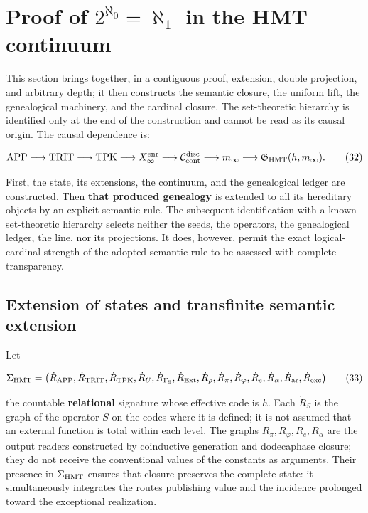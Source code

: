 \section{Proof of \texorpdfstring{\(2^{\aleph_0}=\aleph_1\)}{2 to the power aleph zero equals aleph one} in the HMT continuum}
\label{ix:sec:cierre-cardinal-nativo}

This section brings together, in a contiguous proof, extension, double
projection, and arbitrary depth; it then constructs the semantic closure,
the uniform lift, the genealogical machinery, and the cardinal closure. The
set-theoretic hierarchy is identified only at the end of the construction and
cannot be read as its causal origin. The causal dependence is:

\[
 \mathrm{APP}\longrightarrow\mathrm{TRIT}\longrightarrow\mathrm{TPK}
 \longrightarrow X_\infty^{\rm enr}
 \longrightarrow\mathcal C_{\rm cont}^{\rm disc}
 \longrightarrow m_\infty
 \longrightarrow\mathfrak G_{\rm HMT}(h,m_\infty).
\tag{32}\label{ix:eq:ch-cadena-causal}
\]

First, the state, its extensions, the continuum, and the genealogical ledger
are constructed. Then \textbf{that produced genealogy} is extended to all its
hereditary objects by an explicit semantic rule. The subsequent identification
with a known set-theoretic hierarchy selects neither the seeds, the operators,
the genealogical ledger, the line, nor its projections. It does, however,
permit the exact logical-cardinal strength of the adopted semantic rule to be
assessed with complete transparency.

\subsection{Extension of states and transfinite semantic extension}

Let

\[
 \Sigma_{\rm HMT}
 =\bigl(\dot R_{\rm APP},\dot R_{\rm TRIT},\dot R_{\rm TPK},
 \dot R_{U},\dot R_{\Gamma_9},\dot R_{\rm Ext},\dot R_\rho,
 \dot R_{\pi},\dot R_{\varphi},\dot R_e,\dot R_{\alpha},
 \dot R_{\rm ar},\dot R_{\rm exc}\bigr)
\tag{33}\label{ix:eq:ch-signatura}
\]

the countable \textbf{relational} signature whose effective code is \(h\). Each
\(\dot R_S\) is the graph of the operator \(S\) on the codes where it is
defined; it is not assumed that an external function is total within each
level. The graphs \(\dot R_{\pi},\dot R_{\varphi},\dot R_e,\dot R_{\alpha}\)
are the output readers constructed by coinductive generation and
dodecaphase closure; they do not receive the conventional values of the
constants as arguments. Their presence in \(\Sigma_{\rm HMT}\) ensures that closure
preserves the complete state: it simultaneously integrates the routes publishing
value and the incidence prolonged toward the exceptional realization.

